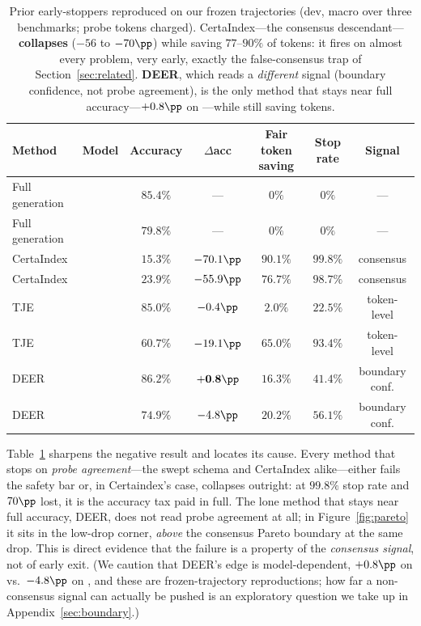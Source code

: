 \begin{table}[t]
  \centering\small
  \begin{tabular}{llccccc}
    \toprule
    Method & Model & Accuracy & $\Delta$acc & Fair token saving & Stop rate & Signal \\
    \midrule
    Full generation & \qweneight{}   & $85.4\%$ & --- & $0\%$ & $0\%$ & --- \\
    Full generation & \dsseven{} & $79.8\%$ & --- & $0\%$ & $0\%$ & --- \\
    \midrule
    CertaIndex & \qweneight{}   & $15.3\%$ & $-70.1\pp$ & $90.1\%$ & $99.8\%$ & consensus \\
    CertaIndex & \dsseven{} & $23.9\%$ & $-55.9\pp$ & $76.7\%$ & $98.7\%$ & consensus \\
    TJE        & \qweneight{}   & $85.0\%$ & $-0.4\pp$  & $2.0\%$  & $22.5\%$ & token-level \\
    TJE        & \dsseven{} & $60.7\%$ & $-19.1\pp$ & $65.0\%$ & $93.4\%$ & token-level \\
    \midrule
    DEER       & \qweneight{}   & $86.2\%$ & $\mathbf{+0.8\pp}$ & $16.3\%$ & $41.4\%$ & boundary conf. \\
    DEER       & \dsseven{} & $74.9\%$ & $-4.8\pp$  & $20.2\%$ & $56.1\%$ & boundary conf. \\
    \bottomrule
  \end{tabular}
  \caption{Prior early-stoppers reproduced on our frozen trajectories (dev, macro
  over three benchmarks; probe tokens charged). CertaIndex---the consensus
  descendant---\textbf{collapses} ($-56$ to $-70\pp$) while saving $77$--$90\%$ of
  tokens: it fires on almost every problem, very early, exactly the
  false-consensus trap of Section~\ref{sec:related}. \textbf{DEER}, which reads a
  \emph{different} signal (boundary confidence, not probe agreement), is the only
  method that stays near full accuracy---$+0.8\pp$ on \qweneight{}---while still
  saving tokens.}
  \label{tab:baselines}
\end{table}

Table~\ref{tab:baselines} sharpens the negative result and locates its cause.
Every method that stops on \emph{probe agreement}---the swept schema and
CertaIndex alike---either fails the safety bar or, in Certaindex's case,
collapses outright: at $99.8\%$ stop rate and $70\pp$ lost, it is the accuracy
tax paid in full. The lone method that stays near full accuracy, DEER, does not
read probe agreement at all; in Figure~\ref{fig:pareto} it sits in the low-drop
corner, \emph{above} the consensus Pareto boundary at the same drop. This is
direct evidence that the failure is a property of the \emph{consensus signal},
not of early exit. (We caution that DEER's edge is model-dependent, $+0.8\pp$ on
\qweneight{} vs.\ $-4.8\pp$ on \dsseven{}, and these are frozen-trajectory
reproductions; how far a non-consensus signal can actually be pushed is an
exploratory question we take up in Appendix~\ref{sec:boundary}.)

